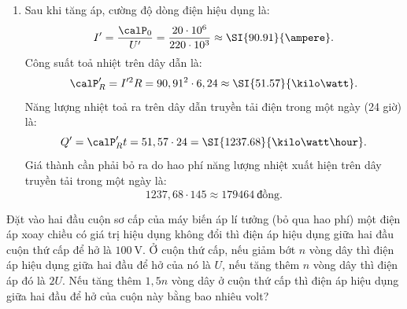 \begin{ex}
{\begin{enumerate}[label=\alph*)]
			$$
			\calP_R=I^2 R=909,09^2 \cdot 6,24 \approx \SI{5157.01}{\kilo\watt}.
			$$
			Năng lượng nhiệt toả ra trên dây dẫn truyền tải điện trong một ngày (24 giờ) là:
			$$
			Q=\calP_R t=5157,01\cdot24= \SI{123768.24}{\kilo\watt\hour}.
			$$
			Giá thành cần phải bỏ ra do hao phí năng lượng nhiệt xuất hiện trên dây truyền tải trong một ngày là: $123768,24\cdot145 \approx 17946395$ đồng.
			\item Sau khi tăng áp, cường độ dòng điện hiệu dụng là:
			$$
			I^{\prime}=\dfrac{\calP_0}{U^{\prime}}=\frac{20\cdot10^6}{220\cdot10^3} \approx \SI{90.91}{\ampere}.
			$$
			Công suất toả nhiệt trên dây dẫn là:
			$$
			\calP_R^{\prime}=I^{\prime 2} R=90,91^2\cdot6,24 \approx \SI{51.57}{\kilo\watt}.
			$$
			Năng lượng nhiệt toả ra trên dây dẫn truyền tải điện trong một ngày (24 giờ) là:
			$$
			Q^{\prime}=\calP_R^{\prime} t=51,57\cdot24= \SI{1237.68}{\kilo\watt\hour}.
			$$
			Giá thành cần phải bỏ ra do hao phí năng lượng nhiệt xuất hiện trên dây truyền tải trong một ngày là:
			$$
			1237,68\cdot145\approx \SI{179464}{\text{đồng}}.
			$$
			
		\end{enumerate}
	}
\end{ex}
\begin{ex}
	Đặt vào hai đầu cuộn sơ cấp của máy biến áp lí tưởng (bỏ qua hao phí) một điện áp xoay chiều có giá trị hiệu dụng không đổi thì điện áp hiệu dụng giữa hai đầu cuộn thứ cấp để hở là $\SI{100}{\volt}$. Ở cuộn thứ cấp, nếu giảm bớt $n$ vòng dây thì điện áp hiệu dụng giữa hai đầu để hở của nó là $U$, nếu tăng thêm $n$ vòng dây thì điện áp đó là $2U$. Nếu tăng thêm $1,5n$ vòng dây ở cuộn thứ cấp thì điện áp hiệu dụng giữa hai đầu để hở của cuộn này bằng bao nhiêu volt?
\end{ex}
